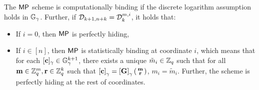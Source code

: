 \begin{theorem} \label{theo:mp} The $\mathsf{MP}$ scheme is computationally binding if  the discrete logarithm assumption holds in $\mathbb{G}_\gamma$. Further, if 
$\mathcal{D}_{k+1,n+k}=\mathcal{D}_k^{m,i}$, it holds that: 
\begin{itemize}
\item If $i=0$,  then $\mathsf{MP}$ is perfectly hiding,
\item If $i \in [n]$, then $\mathsf{MP}$ is statistically binding at coordinate $i$, which means that for each $[\mathbf{c}]_\gamma \in \mathbb{G}_{\gamma}^{k+1}$,
there exists a unique $\tilde{m}_i \in\mathbb{Z}_q$ such that for all $\mathbf{m} \in\mathbb{Z}_q^m, \mathbf{r} \in\mathbb{Z}_q^{k}$ such that  $\left[\mathbf{c}\right]_{\gamma}=\left[\mathbf{{G}}\right]_{\gamma}\left(\begin{smallmatrix}\mathbf{m}\\\mathbf{r}\end{smallmatrix}\right)$, $m_i=\tilde{m}_i$. Further, the scheme is perfectly hiding at the rest of coordinates. 
\end{itemize}
\end{theorem}

